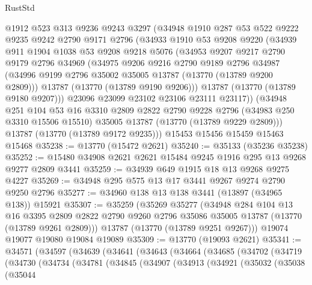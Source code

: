 \begin{lexlean}{RustStd}
\begin{coremodule}
    @1912
    @523
    @313
    @9236
    @9243
    @3297
    (@34948
      @1910
      @287
      @53
      @522
      @9222
      @9235
      @9242
      @2790
      @9171
      @2796
      (@34933
        @1910
        @53
        @9208
        @9220
        (@34939
          @911
          @1904
          @1038
          @53
          @9208
          @9218
          @5076
          (@34953
            @9207
            @9217
            @2790
            @9179
            @2796
            @34969
            (@34975
              @9206
              @9216
              @2790
              @9189
              @2796
              @34987
              (@34996 @9199 @2796 @35002 @35005 @13787 (@13770 (@13789 @9200 @2809)))
              @13787
              (@13770 (@13789 @9190 @9206)))
            @13787
            (@13770 (@13789 @9180 @9207)))
          @23096
          @23099
          @23102
          @23106
          @23111
          @23117))
      (@34948
        @251
        @104
        @53
        @16
        @3310
        @2809
        @2822
        @2790
        @9228
        @2796
        (@34983 @250 @3310 @15506 @15510)
        @35005
        @13787
        (@13770 (@13789 @9229 @2809)))
      @13787
      (@13770 (@13789 @9172 @9235)))
    @15453
    @15456
    @15459
    @15463
    @15468
@35238 := @13770 (@15472 @2621)
@35240 := @35133 (@35236 @35238)
@35252 := @15480 @34908 @2621 @2621 @15484 @9245 @1916 @295 @13 @9268 @9277 @2809 @3441
@35259 := @34939 @649 @1915 @18 @13 @9268 @9275 @4227
@35269 := @34948 @295 @575 @13 @17 @3441 @9267 @9274 @2790 @9250 @2796
@35277 := @34960 @138 @13 @138 @3441 (@13897 (@34965 @138)) @15921
@35307 := @35259
    (@35269
      @35277
      (@34948
        @284
        @104
        @13
        @16
        @3395
        @2809
        @2822
        @2790
        @9260
        @2796
        @35086
        @35005
        @13787
        (@13770 (@13789 @9261 @2809)))
      @13787
      (@13770 (@13789 @9251 @9267)))
    @19074
    @19077
    @19080
    @19084
    @19089
@35309 := @13770 (@19093 @2621)
@35341 := @34571
    (@34597
      (@34639
        (@34641
          (@34643
            (@34664
              (@34685
                (@34702
                  (@34719
                    (@34730
                      (@34734
                        (@34781
                          (@34845
                            (@34907
                              (@34913
                                (@34921
                                  (@35032
                                    (@35038
                                      (@35044

\end{coremodule}
\end{lexlean}
